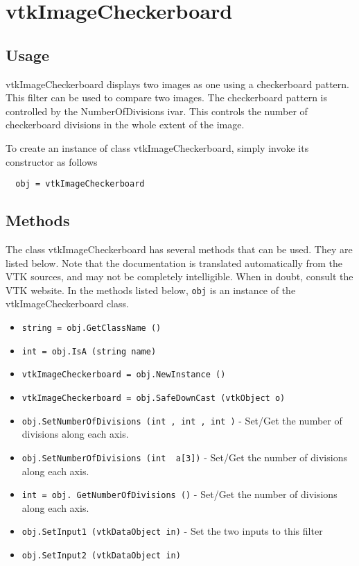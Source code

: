 \section{vtkImageCheckerboard}

\subsection{Usage}

  vtkImageCheckerboard displays two images as one using a checkerboard
  pattern. This filter can be used to compare two images. The
  checkerboard pattern is controlled by the NumberOfDivisions
  ivar. This controls the number of checkerboard divisions in the whole
  extent of the image.

To create an instance of class vtkImageCheckerboard, simply
invoke its constructor as follows
\begin{verbatim}
  obj = vtkImageCheckerboard
\end{verbatim}
\subsection{Methods}

The class vtkImageCheckerboard has several methods that can be used.
  They are listed below.
Note that the documentation is translated automatically from the VTK sources,
and may not be completely intelligible.  When in doubt, consult the VTK website.
In the methods listed below, \verb|obj| is an instance of the vtkImageCheckerboard class.
\begin{itemize}
\item  \verb|string = obj.GetClassName ()|

\item  \verb|int = obj.IsA (string name)|

\item  \verb|vtkImageCheckerboard = obj.NewInstance ()|

\item  \verb|vtkImageCheckerboard = obj.SafeDownCast (vtkObject o)|

\item  \verb|obj.SetNumberOfDivisions (int , int , int )| -  Set/Get the number of divisions along each axis.

\item  \verb|obj.SetNumberOfDivisions (int  a[3])| -  Set/Get the number of divisions along each axis.

\item  \verb|int = obj. GetNumberOfDivisions ()| -  Set/Get the number of divisions along each axis.

\item  \verb|obj.SetInput1 (vtkDataObject in)| -  Set the two inputs to this filter

\item  \verb|obj.SetInput2 (vtkDataObject in)|

\end{itemize}
